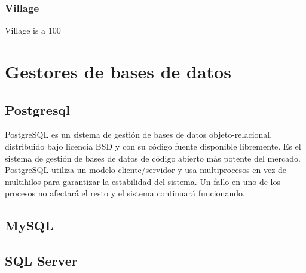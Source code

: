 \documentclass[12pt, oneside]{article}
\begin{document}
\subsubsection{Village}
Village is a 100%

\section{Gestores de bases de datos}

\subsection{Postgresql}
PostgreSQL es un sistema de gestión de bases de datos objeto-relacional, distribuido bajo licencia BSD y con su código fuente disponible libremente. Es el sistema de gestión de bases de datos de código abierto más potente del mercado.
PostgreSQL utiliza un modelo cliente/servidor y usa multiprocesos en vez de multihilos para garantizar la estabilidad del sistema. Un fallo en uno de los procesos no afectará el resto y el sistema continuará funcionando.

\subsection{MySQL}

\subsection{SQL Server}

%
\end{document}
